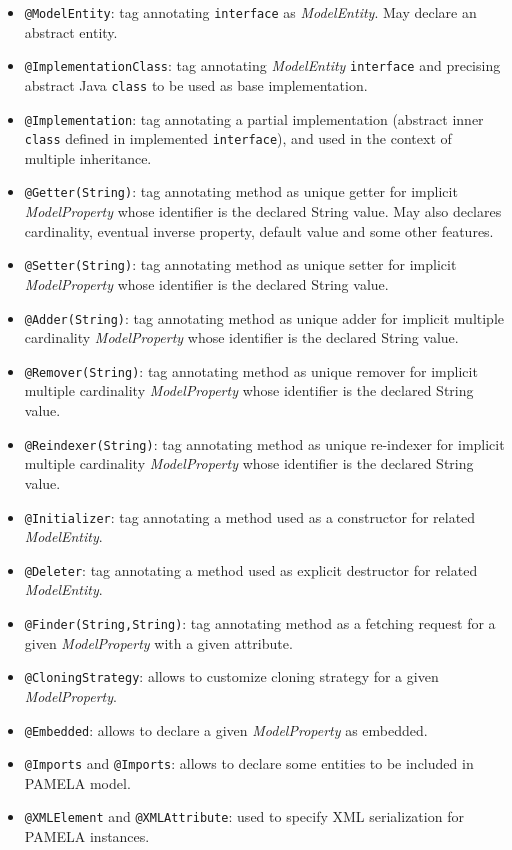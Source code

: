 \begin{itemize}
    \item \texttt{@ModelEntity}: tag annotating \texttt{interface} as \emph{ModelEntity}. May declare an abstract entity.
    \item \texttt{@ImplementationClass}: tag annotating \emph{ModelEntity} \texttt{interface} and precising abstract Java \texttt{class} to be used as base implementation.
    \item \texttt{@Implementation}: tag annotating a partial implementation (abstract inner \texttt{class} defined in implemented \texttt{interface}), and used in the context of multiple inheritance.
    \item \texttt{@Getter(String)}: tag annotating method as unique getter for implicit \emph{ModelProperty} whose identifier is the declared String value. May also declares cardinality, eventual inverse property, default value and some other features.
    \item \texttt{@Setter(String)}: tag annotating method as unique setter for implicit \emph{ModelProperty} whose identifier is the declared String value.
    \item \texttt{@Adder(String)}: tag annotating method as unique adder for implicit multiple cardinality \emph{ModelProperty} whose identifier is the declared String value.
    \item \texttt{@Remover(String)}: tag annotating method as unique remover for implicit multiple cardinality \emph{ModelProperty} whose identifier is the declared String value.
    \item \texttt{@Reindexer(String)}: tag annotating method as unique re-indexer for implicit multiple cardinality \emph{ModelProperty} whose identifier is the declared String value.
    \item \texttt{@Initializer}: tag annotating a method used as a constructor for related \emph{ModelEntity}.
   \item \texttt{@Deleter}: tag annotating a method used as explicit destructor for related \emph{ModelEntity}.
    \item \texttt{@Finder(String,String)}: tag annotating method as a fetching request for a given \emph{ModelProperty} with a given attribute.
    \item \texttt{@CloningStrategy}: allows to customize cloning strategy for a given \emph{ModelProperty}.
    \item \texttt{@Embedded}: allows to declare a given \emph{ModelProperty} as
      embedded. %
    \item \texttt{@Imports} and \texttt{@Imports}: allows to declare some entities to be included in PAMELA model.
    \item \texttt{@XMLElement} and \texttt{@XMLAttribute}: used to specify XML serialization for PAMELA instances.
    
\end{itemize}

